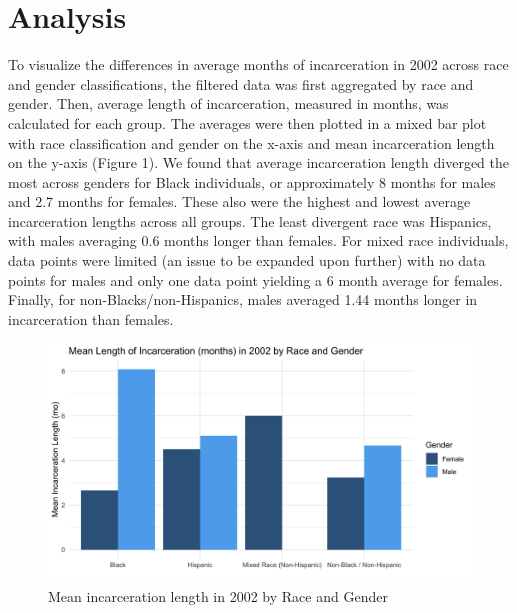 \documentclass[12pt]{article}
\begin{document}
\section*{Analysis}
To visualize the differences in average months of incarceration in 2002 across race and gender classifications, the filtered data was first aggregated by race and gender. Then, average length of incarceration, measured in months, was calculated for each group. The averages were then plotted in a mixed bar plot with race classification and gender on the x-axis and mean incarceration length on the y-axis (Figure 1). We found that average incarceration length diverged the most across genders for Black individuals, or approximately 8 months for males and 2.7 months for females. These also were the highest and lowest average incarceration lengths across all groups. The least divergent race was Hispanics, with males averaging 0.6 months longer than females. For mixed race individuals, data points were limited (an issue to be expanded upon further) with no data points for males and only one data point yielding a 6 month average for females. Finally, for non-Blacks/non-Hispanics, males averaged 1.44 months longer in incarceration than females. 

\begin{figure}[H]
    \begin{center}
        \includegraphics[width=.85\textwidth]{incarcerations_by_racegender}
    \end{center}
    \caption{Mean incarceration length in 2002 by Race and Gender}
    \label{fig:graph}
\end{figure}


\begin{table}[H]

\end{table}
\end{document}
